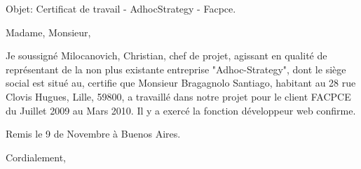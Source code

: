 \documentclass[11pt]{letter} %
\begin{document}

\begin{letter}{} 
\date{}%


\signature{Christian Milocanovich - c.milocanovich@globant.com} %


Objet: Certificat de travail - AdhocStrategy - Facpce. 

\opening{Madame, Monsieur,} 

Je soussigné  Milocanovich, Christian,  chef de projet, agissant en qualité de représentant de la non plus existante entreprise "Adhoc-Strategy", dont le siège social est situé au, certifie que Monsieur Bragagnolo Santiago, habitant au 28 rue Clovis Hugues, Lille, 59800, a travaillé dans notre projet pour le client FACPCE du Juillet 2009 au Mars  2010. Il y a exercé la fonction développeur web confirme. 
 

Remis le 9 de Novembre à Buenos Aires. 


\closing{Cordialement,}




\end{letter}
\end{document}
